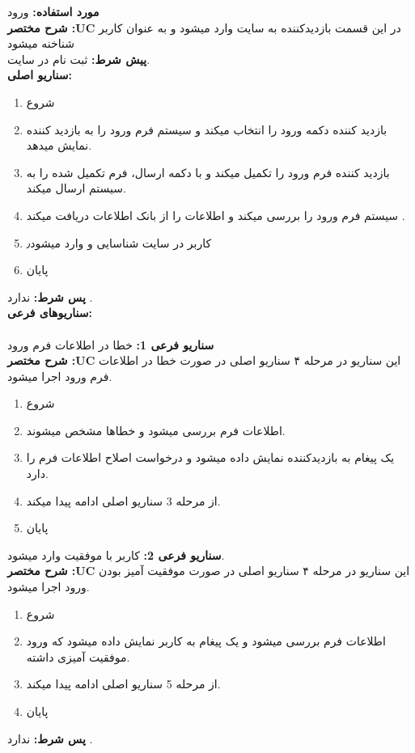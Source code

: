 \noindent \textbf{مورد استفاده:}
ورود
\\
\textbf{شرح مختصر :UC}
در این قسمت بازدیدکننده به سایت وارد میشود و به عنوان کاربر شناخنه میشود
\\
\textbf{پيش شرط:}
ثبت نام در سایت.
\\
\textbf{سناريو اصلی:}
\begin{enumerate}
\item 
شروع
\item 
بازدید کننده دکمه ورود را انتخاب میکند و سیستم فرم ورود را به بازدید کننده نمایش میدهد.
\item 
بازدید کننده فرم ورود را تکمیل میکند و با دکمه ارسال، فرم تکمیل شده را به سیستم ارسال میکند.
\item 
سیستم فرم ورود را بررسی میکند و اطلاعات را از بانک اطلاعات دریافت میکند .
\item 
کاربر در سایت شناسایی و وارد میشود٫
\item 
پایان
\end{enumerate}
\textbf{پس شرط:}
ندارد .
\\
\textbf{سناريوهای فرعی:}
\\ \\
\textbf{سناريو فرعی 1:}
خطا در اطلاعات فرم ورود
\\
\textbf{شرح مختصر :UC}
این سناریو در مرحله ۴ سناریو اصلی در صورت خطا در اطلاعات فرم ورود اجرا میشود.
\begin{enumerate}
\item 
شروع
\item 
اطلاعات فرم بررسی میشود و خطاها مشخص میشوند.
\item 
یک پیغام به بازدیدکننده نمایش داده میشود و درخواست اصلاح اطلاعات فرم را دارد.
\item 
از مرحله 3 سناریو اصلی ادامه پیدا میکند.
\item 
پایان
\end{enumerate}
\textbf{سناريو فرعی 2:}
کاربر با موفقیت وارد میشود.
\\
\textbf{شرح مختصر :UC}
این سناریو در مرحله ۴ سناریو اصلی در صورت موفقیت آمیز بودن ورود اجرا میشود.
\begin{enumerate}
\item 
شروع
\item 
اطلاعات فرم بررسی میشود و یک پیغام به کاربر نمایش داده میشود که ورود موفقیت آمیزی داشته.
\item 
از مرحله 5 سناریو اصلی ادامه پیدا میکند.
\item 
پایان
\end{enumerate}

\textbf{پس شرط:}
ندارد .